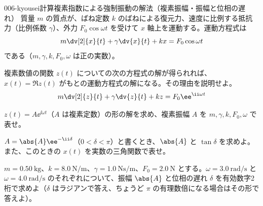 \documentclass[uplatex,dvipdfmx,a4paper,11pt]{jsarticle}
\begin{document}
\begin{mondai}{006-kyousei}{計算}{複素指数による強制振動の解法（複素振幅・振幅と位相の遅れ）}
質量 $m$ の質点が、ばね定数 $k$ のばねによる復元力、速度に比例する抵抗力（比例係数 $\gamma$）、外力 $F_{0}\cos\omega t$ を受けて $x$ 軸上を運動する。運動方程式は
  \[ m\dv[2]{x}{t}+\gamma\dv{x}{t}+kx=F_{0}\cos\omega t \]
  である（$m,\gamma,k,F_{0},\omega$ は正の実数）。
  \begin{shoumon}
    \item 複素数値の関数 $z(t)$ についての次の方程式の解が得られれば、$x(t)=\Re z(t)$ がもとの運動方程式の解になる。その理由を説明せよ。
    \[ m\dv[2]{z}{t}+\gamma\dv{z}{t}+kz=F_{0}\ee^{\ii\omega t} \]
    \item $z(t)=A\ee^{\ii\omega t}$（$A$ は複素定数）の形の解を求め、複素振幅 $A$ を $m,\gamma,k,F_{0},\omega$ で表せ。
    \item $A=\abs{A}\ee^{-\ii\delta}$（$0<\delta<\pi$）と書くとき、$\abs{A}$ と $\tan\delta$ を求めよ。また、このときの $x(t)$ を実数の三角関数で表せ。
    \item $m=\qty{0.50}{\kilogram}$、$k=\qty{8.0}{\newton\per\metre}$、$\gamma=\qty{1.0}{\newton\second\per\metre}$、$F_{0}=\qty{2.0}{\newton}$ とする。$\omega=\qty{3.0}{\radian\per\second}$ と $\omega=\qty{4.0}{\radian\per\second}$ のそれぞれについて、振幅 $\abs{A}$ と位相の遅れ $\delta$ を有効数字2桁で求めよ（$\delta$ はラジアンで答え、ちょうど $\pi$ の有理数倍になる場合はその形で答えよ）。
  \end{shoumon}


\end{mondai}
\end{document}
